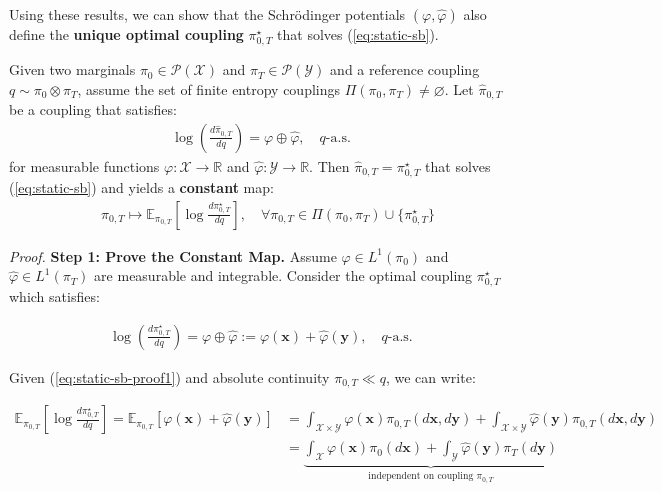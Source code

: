 \documentclass{article}
\newcommand{\boldtext}[1]{\textbf{\textcolor{MyGreen}{#1}}}
\begin{document}
Using these results, we can show that the Schrödinger potentials $(\varphi, \hat{\varphi})$ also define the \boldtext{unique optimal coupling} $\pi^\star_{0,T}$ that solves (\ref{eq:static-sb}).

\begin{proposition}\label{prop:solution-static-sb}
    Given two marginals $\pi_0\in \mathcal{P}(\mathcal{X})$ and $\pi_T\in \mathcal{P}(\mathcal{Y})$ and a reference coupling $q\sim \pi_0\otimes \pi_T$, assume the set of finite entropy couplings $\Pi(\pi_0, \pi_T)\neq \varnothing$. Let $\hat{\pi}_{0,T}$ be a coupling that satisfies:
    \begin{align}
        \log \left(\frac{d\hat{\pi}_{0,T}}{dq}\right)=\varphi\oplus\hat{\varphi}, \quad q\text{-a.s.}
    \end{align}
    for measurable functions $\varphi:\mathcal{X}\to \mathbb{R}$ and $\hat{\varphi}:\mathcal{Y}\to \mathbb{R}$. Then $\hat{\pi}_{0,T}=\pi^\star_{0,T}$ that solves (\ref{eq:static-sb}) and yields a \textbf{constant} map:
    \begin{align}
        \quad \pi_{0,T}\mapsto \mathbb{E}_{\pi_{0,T}}\left[\log \frac{d\pi^\star_{0,T}}{dq}\right], \quad \forall \pi_{0,T}\in \Pi(\pi_0, \pi_T)\cup \{\pi_{0,T}^\star\}
    \end{align}
\end{proposition}
\textit{Proof.} \textbf{Step 1: Prove the Constant Map.} 
Assume $\varphi \in L^1(\pi_0)$ and $\hat{\varphi} \in L^1(\pi_T)$ are measurable and integrable. Consider the optimal coupling $\pi^\star_{0,T}$ which satisfies:
\begin{small}
\begin{align}
    \log \left(\frac{d\pi^\star_{0,T}}{dq}\right)=\varphi\oplus\hat{\varphi}:=\varphi(\boldsymbol{x})+\hat\varphi(\boldsymbol{y}), \quad q\text{-a.s.}\label{eq:static-sb-proof1}
\end{align}
\end{small}
Given (\ref{eq:static-sb-proof1}) and absolute continuity $\pi_{0,T}\ll q$, we can write:
\begin{small}
\begin{align}
    \mathbb{E}_{\pi_{0,T}}\left[\log \frac{d\pi_{0,T}^\star}{dq}\right]=\mathbb{E}_{\pi_{0,T}}\left[\varphi(\boldsymbol{x})+\hat\varphi(\boldsymbol{y})\right]&=\int_{\mathcal{X}\times \mathcal{Y}}\varphi(\boldsymbol{x})\pi_{0,T}(d\boldsymbol{x},d\boldsymbol{y})+\int_{\mathcal{X}\times \mathcal{Y}}\hat\varphi(\boldsymbol{y})\pi_{0,T}(d\boldsymbol{x},d\boldsymbol{y})\nonumber\\
    &=\underbrace{\int_{\mathcal{X}}\varphi(\boldsymbol{x})\pi_{0}(d\boldsymbol{x})+\int_{\mathcal{Y}}\hat\varphi(\boldsymbol{y})\pi_{T}(d\boldsymbol{y})}_{\text{independent on coupling }\pi_{0,T}}
\end{align}
\end{small}
\end{document}
